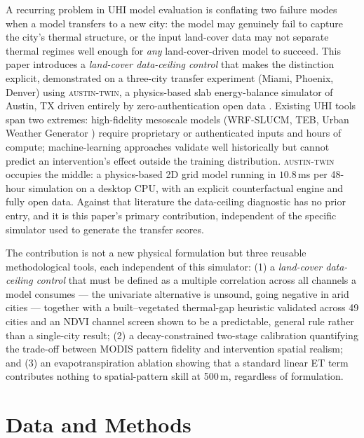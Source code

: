 \documentclass[conference]{IEEEtran}
\begin{document}
A recurring problem in UHI model evaluation is conflating two failure
modes when a model transfers to a new city: the model may genuinely fail
to capture the city's thermal structure, or the input land-cover data may
not separate thermal regimes well enough for \emph{any} land-cover-driven
model to succeed. This paper introduces a \emph{land-cover data-ceiling
control} that makes the distinction explicit, demonstrated on a
three-city transfer experiment (Miami, Phoenix, Denver) using
\textsc{austin-twin}, a physics-based slab energy-balance simulator of
Austin, TX driven entirely by zero-authentication open data
\cite{oke1982energetic, voogt2003thermal, masson2000physically}. Existing
UHI tools span two extremes: high-fidelity mesoscale models (WRF-SLUCM,
TEB, Urban Weather Generator \cite{bueno2013urban, kusaka2001simple})
require proprietary or authenticated inputs and hours of compute;
machine-learning approaches \cite{lyu2022integrated, hoang2025geospatial,
bhamjee2024detection} validate well historically but cannot predict an
intervention's effect outside the training distribution.
\textsc{austin-twin} occupies the middle: a physics-based 2D grid model
running in $10.8$\,ms per 48-hour simulation on a desktop CPU, with an
explicit counterfactual engine and fully open data. Against that
literature the data-ceiling diagnostic has no prior entry, and it is this
paper's primary contribution, independent of the specific simulator used
to generate the transfer scores.

The contribution is not a new physical formulation but three reusable
methodological tools, each independent of this simulator: (1) a
\emph{land-cover data-ceiling control} that must be defined as a multiple
correlation across all channels a model consumes --- the univariate
alternative is unsound, going negative in arid cities --- together with a
built--vegetated thermal-gap heuristic validated across 49 cities and an
NDVI channel screen shown to be a predictable, general rule rather than a
single-city result; (2) a decay-constrained two-stage calibration
quantifying the trade-off between MODIS pattern fidelity and intervention
spatial realism; and (3) an evapotranspiration ablation showing that a
standard linear ET term contributes nothing to spatial-pattern skill at
500\,m, regardless of formulation.

\section{Data and Methods}
\end{document}
